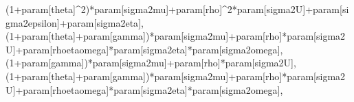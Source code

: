 \documentclass[
]{book}
\newenvironment{Shaded}{\begin{snugshade}}{\end{snugshade}}
\newcommand{\DecValTok}[1]{\textcolor[rgb]{0.00,0.00,0.81}{#1}}
\newcommand{\NormalTok}[1]{#1}
\newcommand{\SpecialCharTok}[1]{\textcolor[rgb]{0.00,0.00,0.00}{#1}}
\newcommand{\StringTok}[1]{\textcolor[rgb]{0.31,0.60,0.02}{#1}}
\theoremstyle{definition}
\theoremstyle{definition}
\theoremstyle{definition}
\theoremstyle{definition}
\theoremstyle{remark}
\begin{document}
\begin{Shaded}
\begin{Highlighting}[]
\NormalTok{                          (}\DecValTok{1}\SpecialCharTok{+}\NormalTok{param[}\StringTok{\textquotesingle{}theta\textquotesingle{}}\NormalTok{]}\SpecialCharTok{\^{}}\DecValTok{2}\NormalTok{)}\SpecialCharTok{*}\NormalTok{param[}\StringTok{\textquotesingle{}sigma2mu\textquotesingle{}}\NormalTok{]}\SpecialCharTok{+}\NormalTok{param[}\StringTok{\textquotesingle{}rho\textquotesingle{}}\NormalTok{]}\SpecialCharTok{\^{}}\DecValTok{2}\SpecialCharTok{*}\NormalTok{param[}\StringTok{\textquotesingle{}sigma2U\textquotesingle{}}\NormalTok{]}\SpecialCharTok{+}\NormalTok{param[}\StringTok{\textquotesingle{}sigma2epsilon\textquotesingle{}}\NormalTok{]}\SpecialCharTok{+}\NormalTok{param[}\StringTok{\textquotesingle{}sigma2eta\textquotesingle{}}\NormalTok{],}
\NormalTok{                          (}\DecValTok{1}\SpecialCharTok{+}\NormalTok{param[}\StringTok{\textquotesingle{}theta\textquotesingle{}}\NormalTok{]}\SpecialCharTok{+}\NormalTok{param[}\StringTok{\textquotesingle{}gamma\textquotesingle{}}\NormalTok{])}\SpecialCharTok{*}\NormalTok{param[}\StringTok{\textquotesingle{}sigma2mu\textquotesingle{}}\NormalTok{]}\SpecialCharTok{+}\NormalTok{param[}\StringTok{\textquotesingle{}rho\textquotesingle{}}\NormalTok{]}\SpecialCharTok{*}\NormalTok{param[}\StringTok{\textquotesingle{}sigma2U\textquotesingle{}}\NormalTok{]}\SpecialCharTok{+}\NormalTok{param[}\StringTok{\textquotesingle{}rhoetaomega\textquotesingle{}}\NormalTok{]}\SpecialCharTok{*}\NormalTok{param[}\StringTok{\textquotesingle{}sigma2eta\textquotesingle{}}\NormalTok{]}\SpecialCharTok{*}\NormalTok{param[}\StringTok{\textquotesingle{}sigma2omega\textquotesingle{}}\NormalTok{],}
\NormalTok{                          (}\DecValTok{1}\SpecialCharTok{+}\NormalTok{param[}\StringTok{\textquotesingle{}gamma\textquotesingle{}}\NormalTok{])}\SpecialCharTok{*}\NormalTok{param[}\StringTok{\textquotesingle{}sigma2mu\textquotesingle{}}\NormalTok{]}\SpecialCharTok{+}\NormalTok{param[}\StringTok{\textquotesingle{}rho\textquotesingle{}}\NormalTok{]}\SpecialCharTok{*}\NormalTok{param[}\StringTok{\textquotesingle{}sigma2U\textquotesingle{}}\NormalTok{],}
\NormalTok{                          (}\DecValTok{1}\SpecialCharTok{+}\NormalTok{param[}\StringTok{\textquotesingle{}theta\textquotesingle{}}\NormalTok{]}\SpecialCharTok{+}\NormalTok{param[}\StringTok{\textquotesingle{}gamma\textquotesingle{}}\NormalTok{])}\SpecialCharTok{*}\NormalTok{param[}\StringTok{\textquotesingle{}sigma2mu\textquotesingle{}}\NormalTok{]}\SpecialCharTok{+}\NormalTok{param[}\StringTok{\textquotesingle{}rho\textquotesingle{}}\NormalTok{]}\SpecialCharTok{*}\NormalTok{param[}\StringTok{\textquotesingle{}sigma2U\textquotesingle{}}\NormalTok{]}\SpecialCharTok{+}\NormalTok{param[}\StringTok{\textquotesingle{}rhoetaomega\textquotesingle{}}\NormalTok{]}\SpecialCharTok{*}\NormalTok{param[}\StringTok{\textquotesingle{}sigma2eta\textquotesingle{}}\NormalTok{]}\SpecialCharTok{*}\NormalTok{param[}\StringTok{\textquotesingle{}sigma2omega\textquotesingle{}}\NormalTok{],}

\end{Highlighting}
\end{Shaded}
\end{document}
